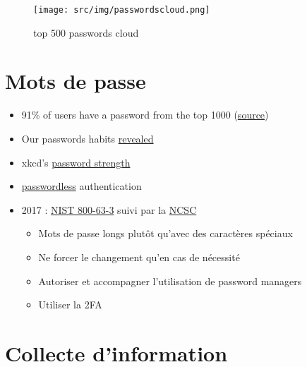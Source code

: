 \begin{figure}
\centering
\texttt{[image: src/img/passwordscloud.png]}
\caption{top 500 passwords cloud}
\end{figure}

\hypertarget{mots-de-passe}{%
\section{Mots de passe}\label{mots-de-passe}}

\begin{itemize}
\tightlist
\item
  91\% of users have a password from the top 1000
  (\href{https://xato.net/10-000-top-passwords-6d6380716fe0\#.q5gcg2vme}{source})
\item
  Our passwords habits
  \href{http://visual.ly/our-password-habits-revealed}{revealed}
\item
  xkcd's \href{http://xkcd.com/936/}{password strength}
\item
  \href{https://hacks.mozilla.org/2014/10/passwordless-authentication-secure-simple-and-fast-to-deploy/}{passwordless}
  authentication
\item
  2017 :
  \href{https://nakedsecurity.sophos.com/2016/08/18/nists-new-password-rules-what-you-need-to-know/}{NIST
  800-63-3} suivi par la
  \href{https://www.ncsc.gov.uk/guidance/password-guidance-simplifying-your-approach}{NCSC}

  \begin{itemize}
  \tightlist
  \item
    Mots de passe longs plutôt qu'avec des caractères spéciaux
  \item
    Ne forcer le changement qu'en cas de nécessité
  \item
    Autoriser et accompagner l'utilisation de password managers
  \item
    Utiliser la 2FA
  \end{itemize}
\end{itemize}

\hypertarget{collecte-dinformation}{%
\section{Collecte d'information}\label{collecte-dinformation}}

